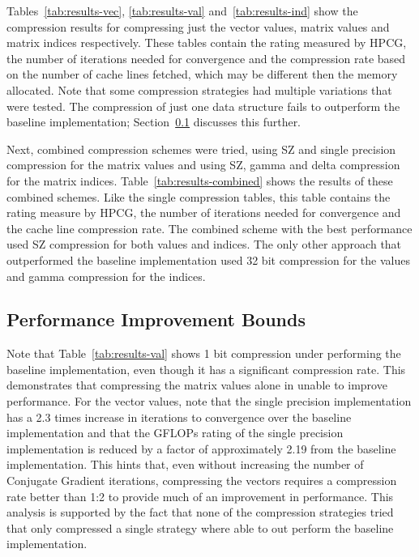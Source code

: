 Tables~\ref{tab:results-vec}, \ref{tab:results-val} and~\ref{tab:results-ind} show the compression results for compressing just the vector values, matrix values and matrix indices respectively.
These tables contain the rating measured by HPCG, the number of iterations needed for convergence and the compression rate based on the number of cache lines fetched, which may be different then the memory allocated.
Note that some compression strategies had multiple variations that were tested.
The compression of just one data structure fails to outperform the baseline implementation; Section~\ref{sec:results-bounds} discusses this further.





Next, combined compression schemes were tried, using SZ and single precision compression for the matrix values and using SZ, gamma and delta compression for the matrix indices.
Table~\ref{tab:results-combined} shows the results of these combined schemes.
Like the single compression tables, this table contains the rating measure by HPCG, the number of iterations needed for convergence and the cache line compression rate.
The combined scheme with the best performance used SZ compression for both values and indices.
The only other approach that outperformed the baseline implementation used 32 bit compression for the values and gamma compression for the indices.



\subsection{Performance Improvement Bounds}
\label{sec:results-bounds}
Note that Table~\ref{tab:results-val} shows 1 bit compression under performing the baseline implementation, even though it has a significant compression rate.
This demonstrates that compressing the matrix values alone in unable to improve performance.
For the vector values, note that the single precision implementation has a 2.3 times increase in iterations to convergence over the baseline implementation and that the GFLOPs rating of the single precision implementation is reduced by a factor of approximately 2.19 from the baseline implementation.
This hints that, even without increasing the number of Conjugate Gradient iterations, compressing the vectors requires a compression rate better than 1:2 to provide much of an improvement in performance.
This analysis is supported by the fact that none of the compression strategies tried that only compressed a single strategy where able to out perform the baseline implementation.

